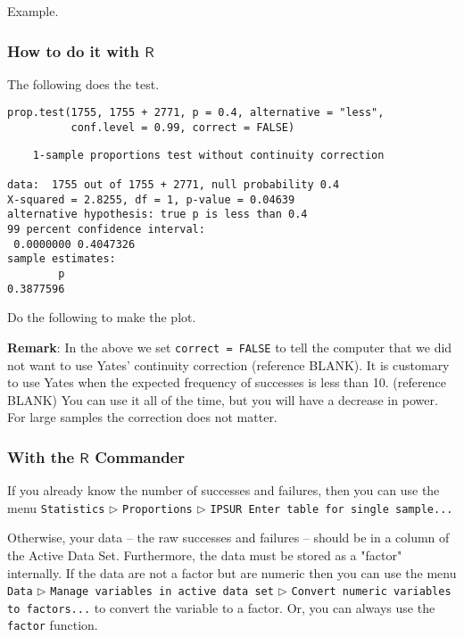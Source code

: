 Example.



\subsubsection{How to do it with \(\mathsf{R}\)}
\label{sec-10-2-1-1}

The following does the test.

\begin{verbatim}
prop.test(1755, 1755 + 2771, p = 0.4, alternative = "less", 
          conf.level = 0.99, correct = FALSE)
\end{verbatim}

\begin{verbatim}
	1-sample proportions test without continuity correction

data:  1755 out of 1755 + 2771, null probability 0.4
X-squared = 2.8255, df = 1, p-value = 0.04639
alternative hypothesis: true p is less than 0.4
99 percent confidence interval:
 0.0000000 0.4047326
sample estimates:
        p 
0.3877596
\end{verbatim}

Do the following to make the plot.


\textbf{Remark}: In the above we set \texttt{correct = FALSE} to tell the computer
that we did not want to use Yates' continuity correction (reference
BLANK).  It is customary to use Yates when the expected frequency of
successes is less than 10. (reference BLANK) You can use it all of the
time, but you will have a decrease in power. For large samples the
correction does not matter.

\subsubsection{With the \(\mathsf{R}\) Commander}
\label{sec-10-2-1-2}

If you already know the number of successes and failures, then you can
use the menu \texttt{Statistics} \(\triangleright\) \texttt{Proportions}
\(\triangleright\) \texttt{IPSUR Enter table for single sample...}

Otherwise, your data -- the raw successes and failures -- should be in
a column of the Active Data Set. Furthermore, the data must be stored
as a "factor" internally. If the data are not a factor but are numeric
then you can use the menu \texttt{Data} \(\triangleright\) \texttt{Manage variables
in active data set} \(\triangleright\) \texttt{Convert numeric variables to
factors...} to convert the variable to a factor. Or, you can always
use the \texttt{factor} function.

